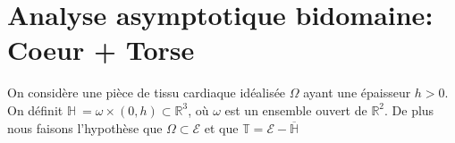 \message{ !name(main_bidomain.tex)}\documentclass[a4paper]{report}
\begin{document}
\section{Analyse asymptotique bidomaine: Coeur + Torse}

On considère une pièce de tissu cardiaque idéalisée $\Omega$ ayant une épaisseur $h>0$. On définit $\mathbb{H}\ = \omega \times (0,h) \subset \mathbb{R}^3$, où $\omega$ est un ensemble ouvert de $\mathbb{R}^2$. De plus nous faisons l'hypothèse que $\Omega \subset \mathcal{E}$ et que $\mathbb{T} = \mathcal{E} - \mathbb{\overline{H}}$  



\end{document}
